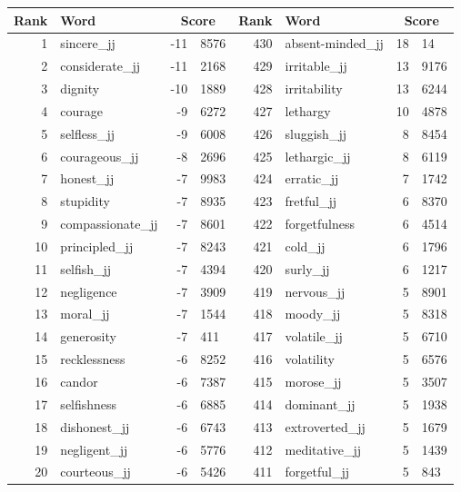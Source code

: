 \begin{table}[tbp]
    \begin{tabular}{| rlr@{.}l | rlr@{.}l |}
    \hline
    \textbf{Rank} & \textbf{Word} & \multicolumn{2}{c|}{\textbf{Score}} & \textbf{Rank} & \textbf{Word} & \multicolumn{2}{c|}{\textbf{Score}} \\
    \hline
    1 & sincere\_jj & -11 & 8576    &    430 & absent-minded\_jj & 18 & 14 \\
    2 & considerate\_jj & -11 & 2168    &    429 & irritable\_jj & 13 & 9176 \\
    3 & dignity & -10 & 1889    &    428 & irritability & 13 & 6244 \\
    4 & courage & -9 & 6272    &    427 & lethargy & 10 & 4878 \\
    5 & selfless\_jj & -9 & 6008    &    426 & sluggish\_jj & 8 & 8454 \\
    6 & courageous\_jj & -8 & 2696    &    425 & lethargic\_jj & 8 & 6119 \\
    7 & honest\_jj & -7 & 9983    &    424 & erratic\_jj & 7 & 1742 \\
    8 & stupidity & -7 & 8935    &    423 & fretful\_jj & 6 & 8370 \\
    9 & compassionate\_jj & -7 & 8601    &    422 & forgetfulness & 6 & 4514 \\
    10 & principled\_jj & -7 & 8243    &    421 & cold\_jj & 6 & 1796 \\
    11 & selfish\_jj & -7 & 4394    &    420 & surly\_jj & 6 & 1217 \\
    12 & negligence & -7 & 3909    &    419 & nervous\_jj & 5 & 8901 \\
    13 & moral\_jj & -7 & 1544    &    418 & moody\_jj & 5 & 8318 \\
    14 & generosity & -7 & 411    &    417 & volatile\_jj & 5 & 6710 \\
    15 & recklessness & -6 & 8252    &    416 & volatility & 5 & 6576 \\
    16 & candor & -6 & 7387    &    415 & morose\_jj & 5 & 3507 \\
    17 & selfishness & -6 & 6885    &    414 & dominant\_jj & 5 & 1938 \\
    18 & dishonest\_jj & -6 & 6743    &    413 & extroverted\_jj & 5 & 1679 \\
    19 & negligent\_jj & -6 & 5776    &    412 & meditative\_jj & 5 & 1439 \\
    20 & courteous\_jj & -6 & 5426    &    411 & forgetful\_jj & 5 & 843 \\

\end{tabular}
\end{table}
